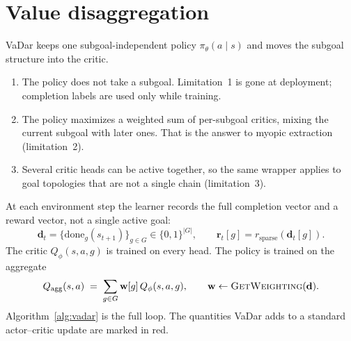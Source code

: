\documentclass[11pt]{article}
\begin{document}
\section{Value disaggregation}
VaDar keeps one subgoal-independent policy $\pi_\theta(a\mid s)$ and moves the subgoal structure into the critic.
\begin{enumerate}[leftmargin=1.4em,itemsep=0.4em]
  \item The policy does not take a subgoal. Limitation~1 is gone at deployment; completion labels are used only while training.
  \item The policy maximizes a weighted sum of per-subgoal critics, mixing the current subgoal with later ones.
        That is the answer to myopic extraction (limitation~2).
  \item Several critic heads can be active together, so the same wrapper applies to goal topologies that are not a single chain (limitation~3).
\end{enumerate}

At each environment step the learner records the full completion vector and a reward vector, not a single active goal:
\[
  \mathbf{d}_t = \{\mathrm{done}_g(s_{t+1})\}_{g\in G}\in\{0,1\}^{|G|},
  \qquad
  \mathbf{r}_t[g] = r_{\mathrm{sparse}}(\mathbf{d}_t[g]).
\]
The critic $Q_\phi(s,a,g)$ is trained on every head.
The policy is trained on the aggregate
\begin{equation}
  Q_{\mathrm{agg}}(s,a)
  \;=\;
  \sum_{g\in G} \mathbf{w}[g]\, Q_\phi(s,a,g),
  \qquad
  \mathbf{w} \leftarrow \textsc{GetWeighting}(\mathbf{d}).
  \label{eq:qagg}
\end{equation}
Algorithm~\ref{alg:vadar} is the full loop. The quantities VaDar adds to a standard actor--critic update are marked in red.
\end{document}
